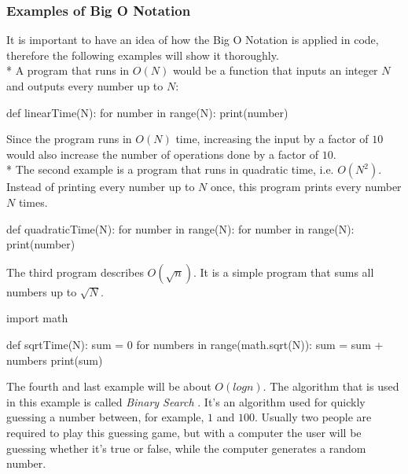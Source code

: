 \documentclass[main.tex]{subfiles}
\begin{document}
\subsubsection{Examples of Big O Notation}

It is important to have an idea of how the Big O Notation is applied in code, therefore the following examples will show it thoroughly.
\newline
\\*
A program that runs in $O(N)$ would be a function that inputs an integer $N$ and outputs every number up to $N$:
\begin{python}
def linearTime(N):
    for number in range(N):
        print(number)
\end{python}

Since the program runs in $O(N)$ time, increasing the input by a factor of $10$ would also increase the number of operations done by a factor of $10$.
\newline
\\*
The second example is a program that runs in quadratic time, i.e. $O(N^{2})$. Instead of printing every number up to $N$ once, this program prints every number $N$ times.

\begin{python}
    def quadraticTime(N):
        for number in range(N):
            for number in range(N):
                print(number)
\end{python}

\vspace{10mm}

The third program describes $O(\sqrt{n})$. It is a simple program that sums all numbers up to $\sqrt{N}$.

\begin{python}
    import math

    def sqrtTime(N):
        sum = 0
        for numbers in range(math.sqrt(N)):
            sum = sum + numbers
        print(sum)
\end{python}

\vspace{10mm}

The fourth and last example will be about $O(log n)$. The algorithm that is used in this example is called \textit{Binary Search} \cite{binary_search}. It's an algorithm used for quickly guessing a number between, for example, $1$ and $100$. Usually two people are required to play this guessing game, but with a computer the user will be guessing whether it's true or false, while the computer generates a random number.
\end{document}
